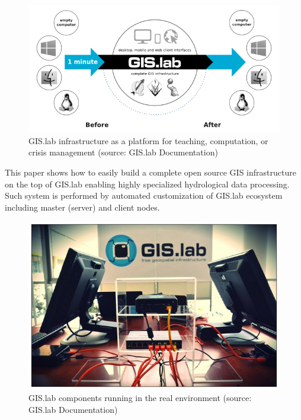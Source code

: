 \documentclass{isprs}
\begin{document}
\begin{figure}[ht!]
\begin{center}
  \includegraphics[width=0.8\columnwidth]{figures/gislab-architecture.png}
  \caption{GIS.lab infrastructure as a platform for teaching,
    computation, or crisis management (source: GIS.lab Documentation)}
\label{fig:gislab_infrastructure}
\end{center}
\end{figure}

This paper shows how to easily build a complete open source GIS
infrastructure on the top of GIS.lab enabling highly specialized
hydrological data processing. Such system is performed by automated
customization of GIS.lab ecosystem including master (server) and
client nodes.

\begin{figure}[ht!]
\begin{center}
  \includegraphics[width=0.8\columnwidth]{figures/gislab-real.jpg}
  \caption{GIS.lab components running in the real environment (source:
    GIS.lab Documentation)}
\label{fig:gislab_infrastructure}
\end{center}
\end{figure}
\end{document}
